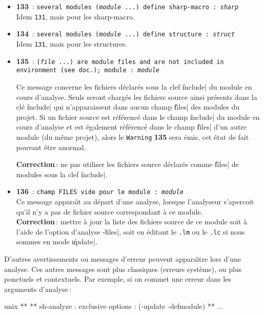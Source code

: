 \begin{itemize}
\item {\Large {\bf 133}}\ : {\tt several modules ({\em module} ...) define
sharp-macro : {\em sharp}}\\
Idem {\tt 131}, mais pour les sharp-macro.

\item {\Large {\bf 134}}\ : {\tt several modules ({\em module} ...) define
structure : {\em struct}}\\
Idem {\tt 131}, mais pour les structures.

\item {\Large {\bf 135}}\ : {\tt ({\em file} ...) 
are module files and are not
included in environment (see doc.); module : {\em module}}

Ce message concerne les fichiers d\'{e}clar\'{e}s sous la clef \|include| du
module en cours d'analyse. Seuls seront charg\'{e}s
les fichiers source ainsi pr\'{e}sents
dans la cl\'{e} \|include| qui n'apparaissent
dans aucun champ \|files| des modules du projet. Si
un fichier source est r\'{e}f\'{e}renc\'{e} dans le champ
\|include| du module en cours d'analyse et est \'{e}galement 
r\'{e}f\'{e}renc\'{e} dans le champ \|files| d'un autre module (du m\^{e}me
projet), alors le {\tt Warning} {\bf 135} sera \'{e}mis, cet \'{e}tat
de fait pouvant \^{e}tre anormal.

{\bf Correction}\,: ne pas utiliser les fichiers source d\'{e}clar\'{e}s
comme \|files| de modules sous la clef \|include|.

\item {\Large {\bf 136}}\ : 
{\tt champ FILES vide pour le module : {\em module}}\\
Ce message appara\^{\i}t au d\'{e}part d'une analyse, lorsque l'analyseur
s'apercoit qu'il n'y a pas de fichier source correspondant \`{a} ce
module.\\
{\bf Correction}\,: mettre \`{a} jour la liste des fichiers source de ce
module soit \`{a} l'aide de l'option d'analyse \|-files|, soit en
\'{e}ditant le {\tt .lm} ou le {\tt .lc} si nous sommes en mode \|update|.

\end{itemize}

D'autres avertissements ou messages d'erreur peuvent appara\^{\i}tre lors
d'une analyse. Ces autres messages sont plus classiques (erreurs
syst\`{e}me), ou plus ponctuels et contextuels. Par exemple, si on commet
une erreur dans les arguments d'analyse\,:

\begin{Longcode*}
unix%
**
** sh-analyze : exclusive options : (-update -defmodule)
**
 ...
\end{Longcode*}

